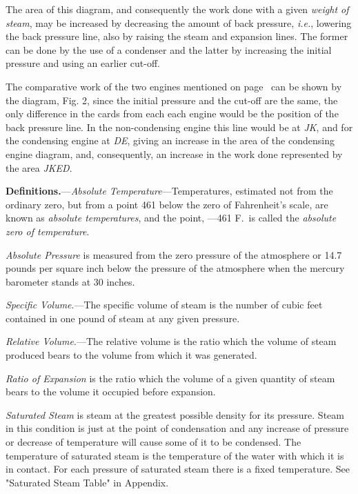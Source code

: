 \documentclass[11pt, a5paper]{book}
\begin{document}
The area of this diagram, and consequently the work done with a given
\textit{weight of steam}, may be increased by decreasing the amount of
back pressure, \textit{i.e.}, lowering the back pressure line, also
by raising the steam and expansion lines.  The former can be done by
the use of a condenser and the latter by increasing the initial
pressure and using an earlier cut-off.\par

The comparative work of the two engines mentioned on
page~\pageref{cond_non-cond} can be shown by the diagram, Fig. 2,
since the initial pressure and the cut-off are the same, the only
difference in the cards from each each engine would be the position of
the back pressure line.  In the non-condensing engine this line would
be at \textit{JK}, and for the condensing engine at \textit{DE},
giving an increase in the area of the condensing engine diagram, and,
consequently, an increase in the work done represented by the area
\textit{JKED}.\par

\textbf{Definitions.}---\textit{Absolute Temperature}---Temperatures,
estimated not from the ordinary zero, but from a point 461\degree{}
below the zero of Fahrenheit's scale, are known as \textit{absolute
  temperatures}, and the point, ---461\degree{} F.\ is called the
\textit{absolute zero of temperature}.\par

\textit{Absolute Pressure} is measured from the zero pressure of the
atmosphere or 14.7 pounds per square inch below the pressure of the
atmosphere when the mercury barometer stands at 30 inches.\par

\textit{Specific Volume}.---The specific volume of steam is the number
of cubic feet contained in one pound of steam at any given
pressure.\par

\textit{Relative Volume}.---The relative volume is the ratio which the
volume of steam produced bears to the volume from which it was
generated.\par

\textit{Ratio of Expansion} is the ratio which the volume of a given
quantity of steam bears to the volume it occupied before
expansion.\par

\textit{Saturated Steam} is steam at the greatest possible density for
its pressure.  Steam in this condition is just at the point of
condensation and any increase of pressure or decrease of temperature
will cause some of it to be condensed.  The temperature of saturated
steam is the temperature of the water with which it is in contact.
For each pressure of saturated steam there is a fixed temperature.
See "Saturated Steam Table" in Appendix.\par
\end{document}
